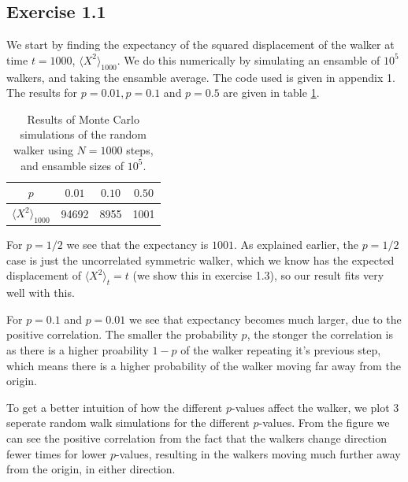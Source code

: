 \documentclass[a4paper, 11pt, notitlepage, english]{article}
\begin{document}
\clearpage

\subsection*{Exercise 1.1}
We start by finding the expectancy of the squared displacement of the walker at time $t=1000$, $\langle X^2 \rangle_{1000}$. We do this numerically by simulating an ensamble of $10^5$ walkers, and taking the ensamble average. The code used is given in appendix 1. The results for $p=0.01, p=0.1$ and $p=0.5$ are given in table \ref{table:Monte_carlo1}. 

\begin{table}[htbp]
\centering
\begin{tabular}{|c|c|c|c|}\hline
$p$ & $0.01$ & $0.10$ & $0.50$ \\ \hline
$\langle X^2 \rangle_{1000}$ & 94692 & 8955 & 1001  \\ \hline
\end{tabular}
\caption{Results of Monte Carlo simulations of the random walker using $N=1000$ steps, and ensamble sizes of $10^5$. \label{table:Monte_carlo1}}
\end{table}

For $p=1/2$ we see that the expectancy is $1001$. As explained earlier, the $p=1/2$ case is just the uncorrelated symmetric walker, which we know has the expected displacement of $\langle X^2 \rangle_t = t$ (we show this in exercise 1.3), so our result fits very well with this.

For $p=0.1$ and $p=0.01$ we see that expectancy becomes much larger, due to the positive correlation. The smaller the probability $p$, the stonger the correlation is as there is a higher proability $1-p$ of the walker repeating it's previous step, which means there is a higher probability of the walker moving far away from the origin. 

To get a better intuition of how the different $p$-values affect the walker, we plot 3 seperate random walk simulations for the different $p$-values. From the figure we can see the positive correlation from the fact that the walkers change direction fewer times for lower $p$-values, resulting in the walkers moving much further away from the origin, in either direction.
\end{document}
